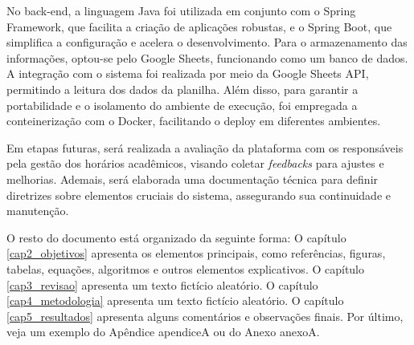 No back-end, a linguagem Java foi utilizada em conjunto com o Spring Framework, que facilita a criação de aplicações robustas, e o Spring Boot, que simplifica a configuração e acelera o desenvolvimento. Para o armazenamento das informações, optou-se pelo Google Sheets, funcionando como um banco de dados. A integração com o sistema foi realizada por meio da Google Sheets API, permitindo a leitura dos dados da planilha. Além disso, para garantir a portabilidade e o isolamento do ambiente de execução, foi empregada a conteinerização com o Docker, facilitando o deploy em diferentes ambientes.

Em etapas futuras, será realizada a avaliação da plataforma com os responsáveis pela gestão dos horários acadêmicos, visando coletar \textit{feedbacks} para ajustes e melhorias. Ademais, será elaborada uma documentação técnica para definir diretrizes sobre elementos cruciais do sistema, assegurando sua continuidade e manutenção.

O resto do documento está organizado da seguinte forma: O capítulo \ref{cap2_objetivos} apresenta os elementos principais, como referências, figuras, tabelas, equações, algoritmos e outros elementos explicativos. O capítulo \ref{cap3_revisao} apresenta um texto fictício aleatório. O capítulo \ref{cap4_metodologia} apresenta um texto fictício aleatório. O capítulo \ref{cap5_resultados} apresenta alguns comentários e observações finais. Por último, veja um exemplo do Apêndice apendiceA ou do Anexo anexoA.


